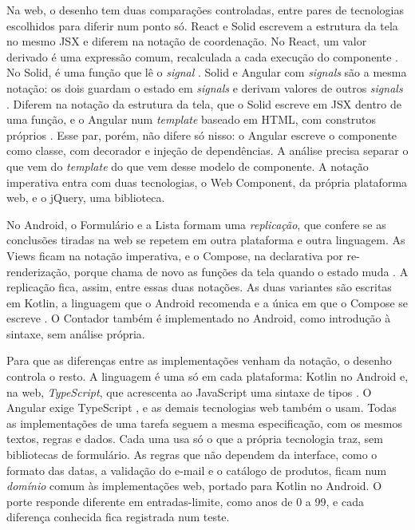 Na web, o desenho tem duas comparações controladas, entre pares de
tecnologias escolhidos para diferir num ponto só.
React e Solid escrevem a estrutura da tela no mesmo JSX e diferem na
notação de coordenação.
No React, um valor derivado é uma expressão comum, recalculada a cada
execução do componente \cite{meta2026b}.
No Solid, é uma função que lê o \emph{signal} \cite{solidjs2026a}.
Solid e Angular com \emph{signals} são a mesma notação: os dois guardam o
estado em \emph{signals} e derivam valores de outros \emph{signals}
\cite{solidjs2026a,google2026}.
Diferem na notação da estrutura da tela, que o Solid escreve em JSX dentro
de uma função, e o Angular num \emph{template} baseado em HTML, com construtos
próprios \cite{google2026a}.
Esse par, porém, não difere só nisso: o Angular escreve o componente como
classe, com decorador e injeção de dependências.
A análise precisa separar o que vem do \emph{template} do que vem desse modelo
de componente.
A notação imperativa entra com duas tecnologias, o Web Component, da
própria plataforma web, e o jQuery, uma biblioteca.

No Android, o Formulário e a Lista formam uma \emph{replicação}, que confere se
as conclusões tiradas na web se repetem em outra plataforma e outra
linguagem.
As Views ficam na notação imperativa, e o Compose, na declarativa por
re-renderização, porque chama de novo as funções da tela quando o estado
muda \cite{android2026}.
A replicação fica, assim, entre essas duas notações.
As duas variantes são escritas em Kotlin, a linguagem que o Android
recomenda e a única em que o Compose se escreve \cite{android2026a}.
O Contador também é implementado no Android, como introdução à sintaxe,
sem análise própria.

Para que as diferenças entre as implementações venham da notação, o
desenho controla o resto.
A linguagem é uma só em cada plataforma: Kotlin no Android e, na web,
\emph{TypeScript}, que acrescenta ao JavaScript uma sintaxe de tipos
\cite{microsoft2026}.
O Angular exige TypeScript \cite{google2026b}, e as demais tecnologias web
também o usam.
Todas as implementações de uma tarefa seguem a mesma especificação, com os
mesmos textos, regras e dados.
Cada uma usa só o que a própria tecnologia traz, sem bibliotecas de
formulário.
As regras que não dependem da interface, como o formato das datas, a
validação do e-mail e o catálogo de produtos, ficam num \emph{domínio} comum
às implementações web, portado para Kotlin no Android.
O porte responde diferente em entradas-limite, como anos de 0 a 99, e
cada diferença conhecida fica registrada num teste.

